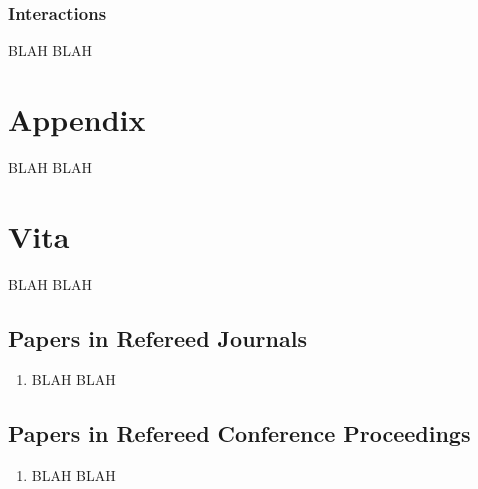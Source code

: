 \documentclass[final]{ukthesis}
\begin{document}
\subsection{Interactions}
\label{sec:Ints}
BLAH BLAH


\copyrightnotice
\backmatter
 

%

\copyrightnotice

\chapter{Appendix}

BLAH BLAH

\copyrightnotice

\chapter{Vita}
BLAH BLAH

\section*{Papers in Refereed Journals}
\begin{enumerate}
\item BLAH BLAH
\end{enumerate}

\section*{Papers in Refereed Conference Proceedings}
\begin{enumerate}

\item BLAH BLAH

\end{enumerate}

\copyrightnotice
\end{document}
